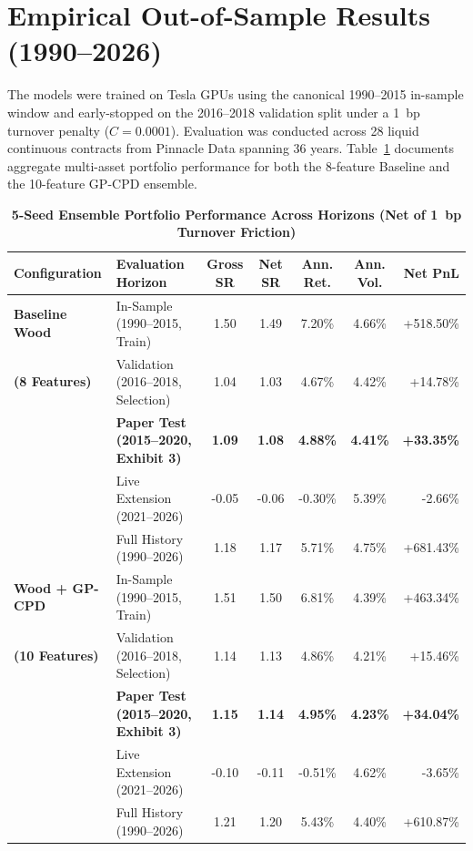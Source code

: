 \documentclass[11pt,a4paper]{article}
\begin{document}
\section{Empirical Out-of-Sample Results (1990--2026)}

The models were trained on Tesla GPUs using the canonical 1990--2015 in-sample window and early-stopped on the 2016--2018 validation split under a 1~bp turnover penalty ($C = 0.0001$). Evaluation was conducted across 28 liquid continuous contracts from Pinnacle Data spanning 36 years. Table~\ref{tab:portfolio_perf} documents aggregate multi-asset portfolio performance for both the 8-feature Baseline and the 10-feature GP-CPD ensemble.

\begin{table}[H]
\centering
\small
\caption{\textbf{5-Seed Ensemble Portfolio Performance Across Horizons (Net of 1~bp Turnover Friction)}}
\label{tab:portfolio_perf}
\vspace{0.4em}
\begin{tabularx}{\textwidth}{l l c c c c r}
\toprule
\textbf{Configuration} & \textbf{Evaluation Horizon} & \textbf{Gross SR} & \textbf{Net SR} & \textbf{Ann. Ret.} & \textbf{Ann. Vol.} & \textbf{Net PnL} \\
\midrule
\textbf{Baseline Wood} & In-Sample (1990--2015, Train) & 1.50 & 1.49 & 7.20\% & 4.66\% & +518.50\% \\
\textbf{(8 Features)} & Validation (2016--2018, Selection) & 1.04 & 1.03 & 4.67\% & 4.42\% & +14.78\% \\
& \textbf{Paper Test (2015--2020, Exhibit 3)} & \textbf{1.09} & \textbf{1.08} & \textbf{4.88\%} & \textbf{4.41\%} & \textbf{+33.35\%} \\
& Live Extension (2021--2026) & -0.05 & -0.06 & -0.30\% & 5.39\% & -2.66\% \\
& Full History (1990--2026) & 1.18 & 1.17 & 5.71\% & 4.75\% & +681.43\% \\
\midrule
\textbf{Wood + GP-CPD} & In-Sample (1990--2015, Train) & 1.51 & 1.50 & 6.81\% & 4.39\% & +463.34\% \\
\textbf{(10 Features)} & Validation (2016--2018, Selection) & 1.14 & 1.13 & 4.86\% & 4.21\% & +15.46\% \\
& \textbf{Paper Test (2015--2020, Exhibit 3)} & \textbf{1.15} & \textbf{1.14} & \textbf{4.95\%} & \textbf{4.23\%} & \textbf{+34.04\%} \\
& Live Extension (2021--2026) & -0.10 & -0.11 & -0.51\% & 4.62\% & -3.65\% \\
& Full History (1990--2026) & 1.21 & 1.20 & 5.43\% & 4.40\% & +610.87\% \\
\bottomrule
\end{tabularx}
\end{table}
\end{document}
